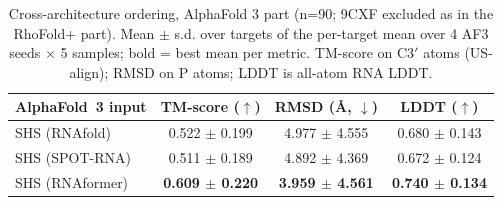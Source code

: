 \begin{table}[htbp]
\centering
\caption{Cross-architecture ordering, AlphaFold 3 part (n=90; 9CXF excluded as in the RhoFold+ part). Mean $\pm$ s.d. over targets of the per-target mean over 4 AF3 seeds $\times$ 5 samples; bold = best mean per metric. TM-score on C3$'$ atoms (US-align); RMSD on P atoms; LDDT is all-atom RNA LDDT.}
\label{tab:order_rna_single_chain_af3}
\begin{tabular}{lccc}
\toprule
AlphaFold~3 input & TM-score ($\uparrow$) & RMSD (\AA, $\downarrow$) & LDDT ($\uparrow$) \\
\midrule
SHS (RNAfold) & 0.522 $\pm$ 0.199 & 4.977 $\pm$ 4.555 & 0.680 $\pm$ 0.143 \\
SHS (SPOT-RNA) & 0.511 $\pm$ 0.189 & 4.892 $\pm$ 4.369 & 0.672 $\pm$ 0.124 \\
SHS (RNAformer) & \textbf{0.609 $\pm$ 0.220} & \textbf{3.959 $\pm$ 4.561} & \textbf{0.740 $\pm$ 0.134} \\
\bottomrule
\end{tabular}
\end{table}
